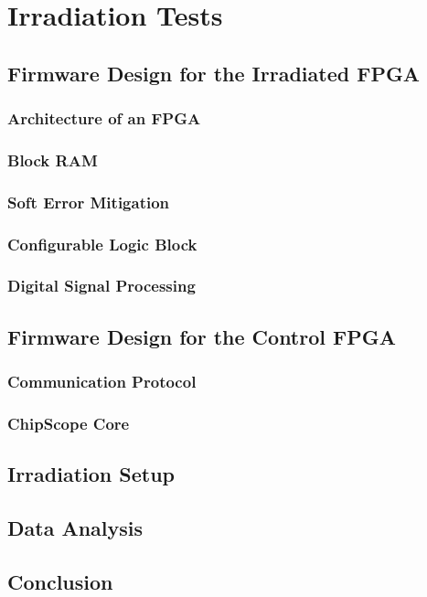\chapter{Irradiation Tests}
\label{chap:II-6-irradiation}

  \section{Firmware Design for the Irradiated FPGA}

    \subsection{Architecture of an FPGA}

    \subsection{Block RAM}

    \subsection{Soft Error Mitigation}

    \subsection{Configurable Logic Block}

    \subsection{Digital Signal Processing}

  \section{Firmware Design for the Control FPGA}

    \subsection{Communication Protocol}

    \subsection{ChipScope Core}

  \section{Irradiation Setup}

  \section{Data Analysis}

  \section{Conclusion}
